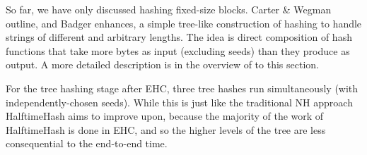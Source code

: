 \documentclass[sigconf, nonacm]{acmart}
\begin{document}
So far, we have only discussed hashing fixed-size blocks.
Carter \& Wegman outline, and Badger enhances, a simple tree-like construction of hashing to handle strings of different and arbitrary lengths. \cite{badger,carter-wegman-79}
The idea is direct composition of hash functions that take more bytes as input (excluding seeds) than they produce as output.
A more detailed description is in the overview of to this section.

For the tree hashing stage after EHC, three tree hashes run simultaneously (with independently-chosen seeds).
While this is just like the traditional NH approach HalftimeHash aims to improve upon, because the majority of the work of HalftimeHash is done in EHC, and so the higher levels of the tree are less consequential to the end-to-end time.








\end{document}
